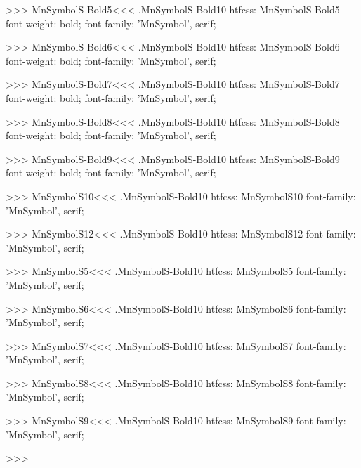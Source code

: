 >>>
\<MnSymbolS-Bold5\><<<
.MnSymbolS-Bold10
htfcss:  MnSymbolS-Bold5  font-weight: bold; font-family: 'MnSymbol', serif;

>>>
\<MnSymbolS-Bold6\><<<
.MnSymbolS-Bold10
htfcss:  MnSymbolS-Bold6  font-weight: bold; font-family: 'MnSymbol', serif;

>>>
\<MnSymbolS-Bold7\><<<
.MnSymbolS-Bold10
htfcss:  MnSymbolS-Bold7  font-weight: bold; font-family: 'MnSymbol', serif;

>>>
\<MnSymbolS-Bold8\><<<
.MnSymbolS-Bold10
htfcss:  MnSymbolS-Bold8  font-weight: bold; font-family: 'MnSymbol', serif;

>>>
\<MnSymbolS-Bold9\><<<
.MnSymbolS-Bold10
htfcss:  MnSymbolS-Bold9  font-weight: bold; font-family: 'MnSymbol', serif;

>>>
\<MnSymbolS10\><<<
.MnSymbolS-Bold10
htfcss:  MnSymbolS10  font-family: 'MnSymbol', serif;

>>>
\<MnSymbolS12\><<<
.MnSymbolS-Bold10
htfcss:  MnSymbolS12  font-family: 'MnSymbol', serif;

>>>
\<MnSymbolS5\><<<
.MnSymbolS-Bold10
htfcss:  MnSymbolS5  font-family: 'MnSymbol', serif;

>>>
\<MnSymbolS6\><<<
.MnSymbolS-Bold10
htfcss:  MnSymbolS6  font-family: 'MnSymbol', serif;

>>>
\<MnSymbolS7\><<<
.MnSymbolS-Bold10
htfcss:  MnSymbolS7  font-family: 'MnSymbol', serif;

>>>
\<MnSymbolS8\><<<
.MnSymbolS-Bold10
htfcss:  MnSymbolS8  font-family: 'MnSymbol', serif;

>>>
\<MnSymbolS9\><<<
.MnSymbolS-Bold10
htfcss:  MnSymbolS9  font-family: 'MnSymbol', serif;

>>>
\bye

